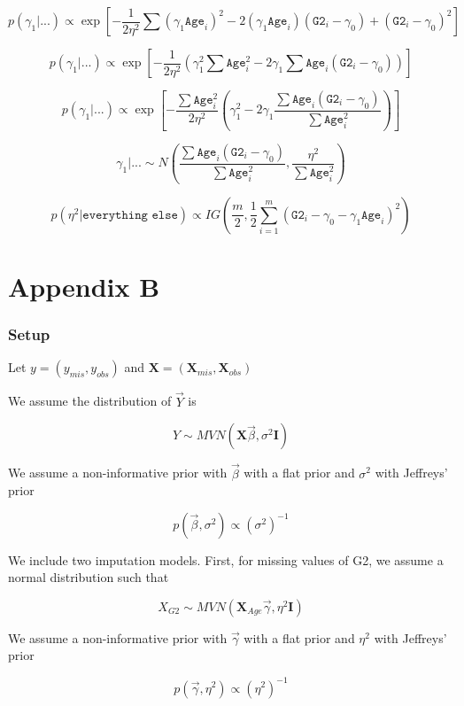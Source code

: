 \documentclass[11pt]{article}
\begin{document}
$$p(\gamma_1 | ...) \propto \exp \left[ -\frac{1}{2\eta^2} \sum (\gamma_1 \texttt{Age}_i)^2 
-2 (\gamma_1 \texttt{Age}_i)(\texttt{G2}_i -\gamma_0 )
+ (\texttt{G2}_i -\gamma_0 )^2 \right]$$

$$p(\gamma_1 | ...) \propto \exp \left[ -\frac{1}{2\eta^2} 
(\gamma_1^2 \sum \texttt{Age}_i^2 
-2 \gamma_1 \sum \texttt{Age}_i(\texttt{G2}_i -\gamma_0 ))\right]$$

$$p(\gamma_1 | ...) \propto \exp \left[ -\frac{\sum\texttt{Age}_i^2}{2\eta^2} 
(\gamma_1^2
-2 \gamma_1 \frac{\sum \texttt{Age}_i(\texttt{G2}_i -\gamma_0 )}{\sum\texttt{Age}_i^2})\right]$$

$$\gamma_1 | ... \sim N\left( 
\frac{\sum \texttt{Age}_i(\texttt{G2}_i -\gamma_0 )}{\sum\texttt{Age}_i^2},
\frac{\eta^2}{\sum\texttt{Age}_i^2} \right)$$

$$p(\eta^2 | \texttt{everything else}) \propto IG \left(
\frac{m}{2},
\frac{1}{2}\sum_{i=1}^m (\texttt{G2}_i - \gamma_0 - \gamma_1\texttt{Age}_i)^2
\right)$$


\newpage
\section{Appendix B}

\subsubsection{Setup}

Let $y = (y_{mis}, y_{obs})$ and $\mathbf{X} = (\mathbf{X}_{mis}, \mathbf{X}_{obs})$

We assume the distribution of $\vec{Y}$ is

$$Y \sim MVN(\mathbf{X}\vec{\beta}, \sigma^2\mathbf{I})$$

We assume a non-informative prior with $\vec{\beta}$ with a flat prior and $\sigma^2$ with Jeffreys' prior

$$p(\vec{\beta}, \sigma^2) \propto (\sigma^2)^{-1}$$

\vspace{0.25in}

We include two imputation models. First, for missing values of G2, we assume a normal distribution such that

$$X_{G2} \sim MVN(\mathbf{X}_{Age}\vec{\gamma}, \eta^2\mathbf{I})$$

We assume a non-informative prior with $\vec{\gamma}$ with a flat prior and $\eta^2$ with Jeffreys' prior

$$p(\vec{\gamma}, \eta^2) \propto (\eta^2)^{-1}$$
\end{document}
